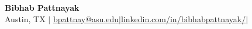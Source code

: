 \documentclass[letterpaper,10.5pt]{article}
\newcommand{\resumeItem}[1]{
  \item\small{
    {#1 \vspace{1pt}}
  }
}
\newcommand{\resumeItemListStart}{\begin{itemize}}
\newcommand{\resumeItemListEnd}{\end{itemize}\vspace{-5pt}}
\begin{document}
\begin{center}
	\small \textbf{\Large Bibhab Pattnayak} \\  
	Austin, TX \hspace{4pt}$\vert$ \hspace{4pt} \href{mailto:bpattnay@asu.edu}{\color{blue}\underline{bpattnay@asu.edu}}\hspace{4pt}$\vert$\hspace{4pt}\href{https://www.linkedin.com/in/bibhabpattnayak/}{\color{blue}\underline{linkedin.com/in/bibhabpattnayak/}\hspace{4pt}}$\vert$\hspace{4pt} \hspace{4pt}{480 - 955 - 9942} 
	\\ 
\end{center}
\vspace{-20pt}
\vspace{2pt}

\vspace{-5pt}



%
\end{document}
